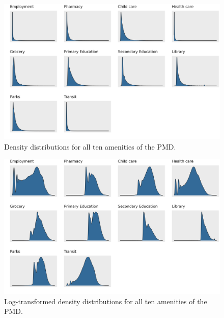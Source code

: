\documentclass[11pt, a4paper]{article}
\begin{document}
\begin{figure}[H]
\centering
\includegraphics[width=\textwidth]{./distributions/distributions.png}
\caption[Density distributions]{Density distributions for all ten amenities of the PMD.}\label{dendist}
\end{figure}







\begin{figure}[H]
\centering
\includegraphics[width=\textwidth]{./distributions/log_distributions.png}
\caption[Log density distributions]{ Log-transformed density distributions for all ten amenities of the PMD.}\label{logdendist}
\end{figure}
\end{document}

